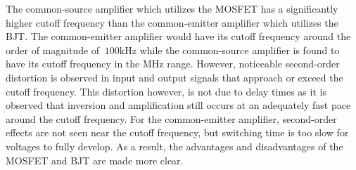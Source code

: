 The common-source amplifier which utilizes the MOSFET has a significantly higher cutoff frequency than the common-emitter amplifier which utilizes the BJT. The common-emitter amplifier would have its cutoff frequency around the order of magnitude of $~100$\si{\kilo\hertz} while the common-source amplifier is found to have its cutoff frequency in the \si{\mega\hertz} range. However, noticeable second-order distortion is observed in input and output signals that approach or exceed the cutoff frequency. This distortion however, is not due to delay times as it is observed that inversion and amplification still occurs at an adequately fast pace around the cutoff frequency. For the common-emitter amplifier, second-order effects are not seen near the cutoff frequency, but switching time is too slow for voltages to fully develop. As a result, the advantages and disadvantages of the MOSFET and BJT are made more clear.